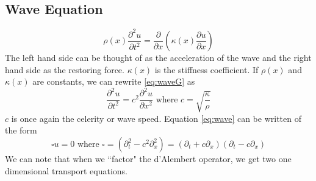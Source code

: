 \documentclass{article}
\newcommand{\pd}[2]{\frac{\partial #1}{\partial #2}}
\newcommand{\pdt}[2]{\frac{\partial ^2 #1}{\partial #2 ^2}}
\numberwithin{equation}{section}
\begin{document}
\subsection{Wave Equation}
\begin{equation}
    \rho(x) \pdt{u}{t} = \frac{\partial}{\partial x} \left( \kappa(x)\pd{u}{x} \right) \label{eq:waveG}
\end{equation}
The left hand side can be thought of as the acceleration of the wave and the right hand side as the restoring force. $\kappa(x)$ is the stiffness coefficient. If $\rho(x)$ and $\kappa(x)$ are constants, we can rewrite \eqref{eq:waveG} as 
\begin{equation}
    \pdt{u}{t} = c^2\pdt{u}{x} \text{ where } c=\sqrt{\frac{\kappa}{\rho}} \label{eq:wave}
\end{equation}
$c$ is once again the celerity or wave speed. Equation \eqref{eq:wave} can be written of the form 
\begin{equation*}
    \square u = 0 \text{ where } \square=(\partial^2_t - c^2\partial^2_x) = (\partial_t+c\partial_x)(\partial_t-c\partial_x)
\end{equation*}
We can note that when we ``factor" the d'Alembert operator, we get two one dimensional transport equations.
\end{document}
